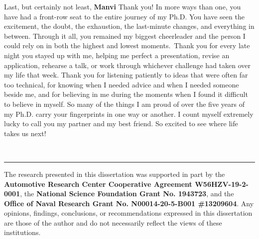 Last, but certainly not least, \textbf{Manvi} \textemdash{} Thank you! In more ways than one, you have had a front-row seat to the entire journey of my Ph.D. You have seen the excitement, the doubt, the exhaustion, the last-minute changes, and everything in between. Through it all, you remained my biggest cheerleader and the person I could rely on in both the highest and lowest moments. Thank you for every late night you stayed up with me, helping me perfect a presentation, revise an application, rehearse a talk, or work through whichever challenge had taken over my life that week. Thank you for listening patiently to ideas that were often far too technical, for knowing when I needed advice and when I needed someone beside me, and for believing in me during the moments when I found it difficult to believe in myself. So many of the things I am proud of over the five years of my Ph.D. carry your fingerprints in one way or another. I count myself extremely lucky to call you my partner and my best friend. So excited to see where life takes us next!

\begin{center}
    \rule{0.5in}{0.25pt}
\end{center}

The research presented in this dissertation was supported in part by the \textbf{Automotive Research Center Cooperative Agreement W56HZV-19-2-0001}, the \textbf{National Science Foundation Grant No. 1943723}, and the \textbf{Office of Naval Research Grant No. N00014-20-5-B001 \#13209604}. Any opinions, findings, conclusions, or recommendations expressed in this dissertation are those of the author and do not necessarily reflect the views of these institutions.